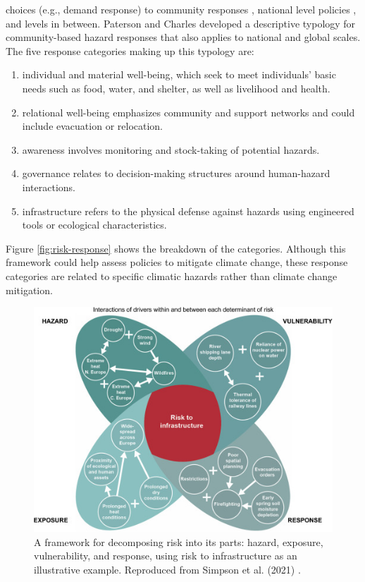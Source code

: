 choices (e.g., demand response) \cite{seck_embedding_2020,rinaldi_what_2022,
dehghanpour_agent-based_2018} to community responses
\cite{paterson_community-based_2019, elmallah_frontlining_2022}, national
level policies \cite{roelfsema_taking_2020, fawzy_strategies_2020}, and levels in between. 
Paterson and
Charles \cite{paterson_community-based_2019} developed a descriptive typology
for community-based hazard responses that also applies to national and global
scales. The five response categories making up this typology are:
\cite{paterson_community-based_2019}
\begin{enumerate}
    \item individual and material well-being, which seek to meet individuals'
    basic needs such as food, water, and shelter, as well as livelihood and
    health.
    \item relational well-being emphasizes community and support networks and
    could include evacuation or relocation.
    \item awareness involves monitoring and stock-taking of potential hazards.
    \item governance relates to decision-making structures around human-hazard
    interactions.
    \item infrastructure refers to the physical defense against hazards using
    engineered tools or ecological characteristics.
\end{enumerate} 
Figure \ref{fig:risk-response} shows the breakdown of the categories. Although
this framework could help assess policies to mitigate climate change, these
response categories are related to specific climatic hazards rather than climate
change mitigation.


\begin{figure}
    \centering
    \includegraphics{figures/simpson-risk-framework.jpg}
    \caption{A framework for decomposing risk into its parts: hazard, exposure,
    vulnerability, and response, using risk to infrastructure as an illustrative
    example. Reproduced from Simpson et al. (2021)
    \cite{simpson_framework_2021}.}
    \label{fig:risk-framework}
\end{figure}

